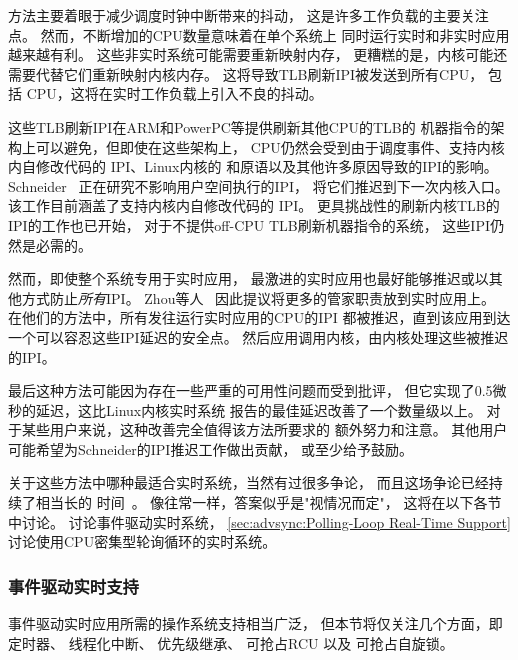 方法主要着眼于减少调度时钟中断带来的抖动，
这是许多工作负载的主要关注点。
然而，不断增加的CPU数量意味着在单个系统上
同时运行实时和非实时应用越来越有利。
这些非实时系统可能需要重新映射内存，
更糟糕的是，内核可能还需要代替它们重新映射内核内存。
这将导致TLB刷新IPI被发送到所有CPU，
包括 CPU，这将在实时工作负载上引入不良的抖动。

这些TLB刷新IPI在ARM和PowerPC等提供刷新其他CPU的TLB的
机器指令的架构上可以避免，但即使在这些架构上，
CPU仍然会受到由于调度事件、支持内核内自修改代码的
 IPI、Linux内核的
和原语以及其他许多原因导致的IPI的影响。
Schneider~\cite{ValentinScheider2025IPIinterference}
正在研究不影响用户空间执行的IPI，
将它们推迟到下一次内核入口。
该工作目前涵盖了支持内核内自修改代码的 IPI。
更具挑战性的刷新内核TLB的IPI的工作也已开始，
对于不提供off-CPU TLB刷新机器指令的系统，
这些IPI仍然是必需的。

然而，即使整个系统专用于实时应用，
最激进的实时应用也最好能够推迟或以其他方式防止\emph{所有}IPI。
Zhou等人~\cite{ZhouyiZhou2025deterministicsub05responselinux}
因此提议将更多的管家职责放到实时应用上。
在他们的方法中，所有发往运行实时应用的CPU的IPI
都被推迟，直到该应用到达一个可以容忍这些IPI延迟的安全点。
然后应用调用内核，由内核处理这些被推迟的IPI。

最后这种方法可能因为存在一些严重的可用性问题而受到批评，
但它实现了0.5微秒的延迟，这比Linux内核实时系统
报告的最佳延迟改善了一个数量级以上。
对于某些用户来说，这种改善完全值得该方法所要求的
额外努力和注意。
其他用户可能希望为Schneider的IPI推迟工作做出贡献，
或至少给予鼓励。

关于这些方法中哪种最适合实时系统，当然有过很多争论，
而且这场争论已经持续了相当长的
时间~\cite{JonCorbet2004RealTimeLinuxPart1,JonCorbet2004RealTimeLinuxPart2}。
像往常一样，答案似乎是"视情况而定"，
这将在以下各节中讨论。
讨论事件驱动实时系统，
\cref{sec:advsync:Polling-Loop Real-Time Support}
讨论使用CPU密集型轮询循环的实时系统。

\subsubsection{事件驱动实时支持}
\label{sec:advsync:Event-Driven Real-Time Support}

事件驱动实时应用所需的操作系统支持相当广泛，
但本节将仅关注几个方面，即
定时器、
线程化中断、
优先级继承、
可抢占RCU
以及
可抢占自旋锁。

